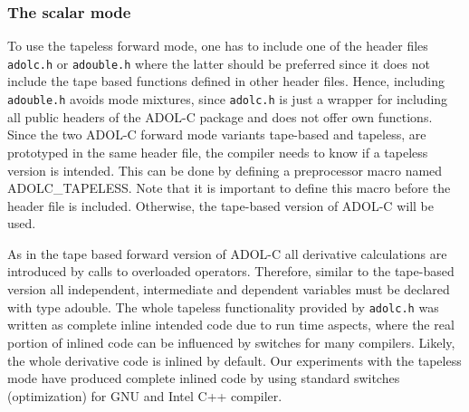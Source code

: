 \documentclass[11pt,twoside]{article}
\begin{document}
\subsubsection*{The scalar mode}
%
To use the tapeless forward mode, one has to include one
of the header files \verb#adolc.h# or \verb#adouble.h#
where the latter should be preferred since it does not include the
tape based functions defined in other header files. Hence, including
\verb#adouble.h# avoids mode mixtures, since
\verb#adolc.h# is just a wrapper for including all public 
  headers of the ADOL-C package and does not offer own functions. 
Since the two ADOL-C forward mode variants tape-based and tapeless,
are prototyped in the same header file, the compiler needs to know if a
tapeless version is intended. This can be done by defining a
preprocessor macro named {\sf ADOLC\_TAPELESS}. Note that it is 
important to define this macro before the header file is included.
Otherwise, the tape-based version of ADOL-C will be used. 

As in the tape based forward version of ADOL-C all derivative
calculations are introduced by calls to overloaded
operators. Therefore, similar to the tape-based version all
independent, intermediate and dependent variables must be declared 
with type {\sf adouble}. The whole tapeless functionality provided by
\verb#adolc.h# was written as complete inline intended code
due to run time aspects, where the real portion of inlined code can
be influenced by switches for many compilers. Likely, the whole
derivative code is inlined by default. Our experiments
with the tapeless mode have produced complete inlined code by using
standard switches (optimization) for GNU and Intel C++
compiler.
\end{document}

